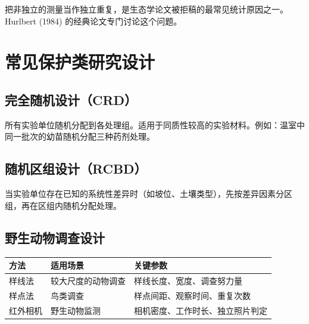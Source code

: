 \documentclass[
  letterpaper,
]{scrbook}
\newcounter{none} %
\begin{document}
\begin{tcolorbox}[enhanced jigsaw, arc=.35mm, bottomrule=.15mm, bottomtitle=1mm, breakable, colback=white, colbacktitle=quarto-callout-warning-color!10!white, colframe=quarto-callout-warning-color-frame, coltitle=black, left=2mm, leftrule=.75mm, opacityback=0, opacitybacktitle=0.6, rightrule=.15mm, title=\textcolor{quarto-callout-warning-color}{\faExclamationTriangle}\hspace{0.5em}{伪重复（Pseudoreplication）}, titlerule=0mm, toprule=.15mm, toptitle=1mm]

把非独立的测量当作独立重复，是生态学论文被拒稿的最常见统计原因之一。Hurlbert
(1984) 的经典论文专门讨论这个问题。

\end{tcolorbox}

\section{常见保护类研究设计}\label{ux5e38ux89c1ux4fddux62a4ux7c7bux7814ux7a76ux8bbeux8ba1}

\subsection{完全随机设计（CRD）}\label{ux5b8cux5168ux968fux673aux8bbeux8ba1crd}

所有实验单位随机分配到各处理组。适用于同质性较高的实验材料。例如：温室中同一批次的幼苗随机分配三种药剂处理。

\subsection{随机区组设计（RCBD）}\label{ux968fux673aux533aux7ec4ux8bbeux8ba1rcbd}

当实验单位存在已知的系统性差异时（如坡位、土壤类型），先按差异因素分区组，再在区组内随机分配处理。

\subsection{野生动物调查设计}\label{ux91ceux751fux52a8ux7269ux8c03ux67e5ux8bbeux8ba1}

{\def\LTcaptype{none} %
\begin{longtable}[]{@{}lll@{}}
\toprule\noalign{}
方法 & 适用场景 & 关键参数 \\
\midrule\noalign{}
\endhead
\bottomrule\noalign{}
\endlastfoot
样线法 & 较大尺度的动物调查 & 样线长度、宽度、调查努力量 \\
样点法 & 鸟类调查 & 样点间距、观察时间、重复次数 \\
红外相机 & 野生动物监测 & 相机密度、工作时长、独立照片判定 \\
\end{longtable}
}
\end{document}
